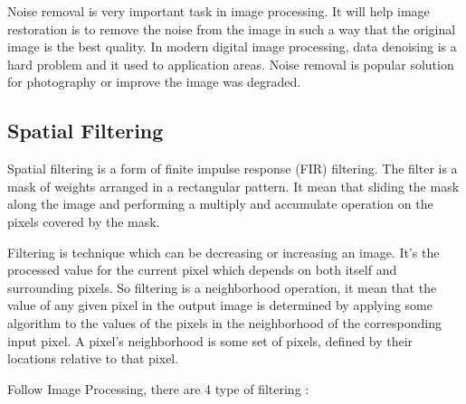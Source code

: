 \documentclass[10pt]{article}
\begin{document}
Noise removal is very important task in image processing. It will help image restoration is to remove the noise from the image in such a way that the original image is the best quality. In modern digital image processing, data denoising is a hard problem and it used to application areas. Noise removal is popular solution for photography or improve the  image was degraded.


\subsection{Spatial Filtering}
Spatial filtering is a form of finite impulse response (FIR) filtering. The filter is a mask of weights arranged in a rectangular pattern. It mean that sliding the mask along the image and performing a multiply and accumulate operation on the pixels covered by the mask.


Filtering is technique which can be decreasing or increasing an image. It's the processed value for the current pixel which depends on both itself and surrounding pixels.
So filtering is a neighborhood operation, it mean that the value of any given pixel in the output image is determined by applying some algorithm to the values of the pixels in the neighborhood of the corresponding input pixel. A pixel's neighborhood is some set of pixels, defined by their locations relative to that pixel. 

Follow Image Processing,  there are 4 type of filtering :
\end{document}

